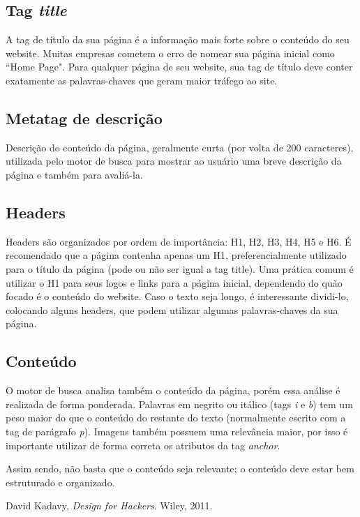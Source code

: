 \documentclass{article}
\begin{document}
\subsection*{Tag \textit{title}}
A tag de título da sua página é a informação mais forte sobre o conteúdo do seu website. Muitas empresas cometem o erro de nomear sua página inicial como ``Home Page". Para qualquer página de seu website, sua tag de título deve conter exatamente as palavras-chaves que geram maior tráfego ao site.

\subsection*{Metatag de descrição}
Descrição do conteúdo da página, geralmente curta (por volta de 200 caracteres), utilizada pelo motor de busca para mostrar ao usuário uma breve descrição da página e também para avaliá-la.

\subsection*{Headers}
Headers são organizados por ordem de importância: H1, H2, H3, H4, H5 e H6. É recomendado que a página contenha apenas um H1, preferencialmente utilizado para o título da página (pode ou não ser igual a tag title). Uma prática comum é utilizar o H1 para seus logos e links para a página inicial, dependendo do quão focado é o conteúdo do website. Caso o texto seja longo, é interessante dividi-lo, colocando alguns headers, que podem utilizar algumas palavras-chaves da sua página.

\subsection*{Conteúdo}
O motor de busca analisa também o conteúdo da página, porém essa análise é realizada de forma ponderada. Palavras em negrito ou itálico (tags \textit{i} e \textit{b}) tem um peso maior do que o conteúdo do restante do texto (normalmente escrito com a tag de parágrafo \textit{p}). Imagens também possuem uma relevância maior, por isso é importante utilizar de forma correta os atributos da tag \textit{anchor}.

Assim sendo, não basta que o conteúdo seja relevante; o conteúdo deve estar bem estruturado e organizado.

\begin{thebibliography}{9}

David Kadavy,
      \emph{Design for Hackers}.
      Wiley,
      2011.

      \end{thebibliography}
\end{document}
